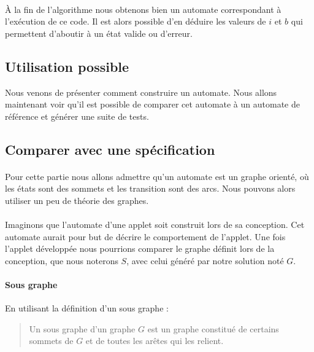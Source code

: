 \paragraph{}
À la fin de l'algorithme nous obtenons bien un automate correspondant à 
l'exécution de ce code. Il est alors possible d'en déduire les valeurs de $i$ 
et 
$b$ qui permettent d'aboutir à un état valide ou d'erreur.

\subsection{Utilisation possible}

Nous venons de présenter comment construire un automate. Nous allons maintenant 
voir qu'il est possible de comparer cet automate à un automate de référence et 
générer une suite de tests.

\subsection{Comparer avec une spécification}

\paragraph{}
Pour cette partie nous allons admettre qu'un automate est un graphe orienté, où 
les états sont des sommets et les transition sont des arcs. Nous pouvons alors 
utiliser un peu de théorie des graphes.

\paragraph{}
Imaginons que l'automate d'une applet soit construit lors de sa conception. Cet 
automate aurait pour but de décrire le comportement de l'applet. Une fois l'applet 
développée nous pourrions comparer le graphe définit lors 
de la conception, que nous noterons $S$, avec celui généré par notre solution 
 noté $G$.

\paragraph{Sous graphe}
En utilisant la définition d'un sous graphe \cite{th_graph}:

\begin{quote}
 Un sous graphe d’un graphe $G$ est un graphe constitué de certains sommets de 
$G$ et de toutes les arêtes qui les relient.
\end{quote}


